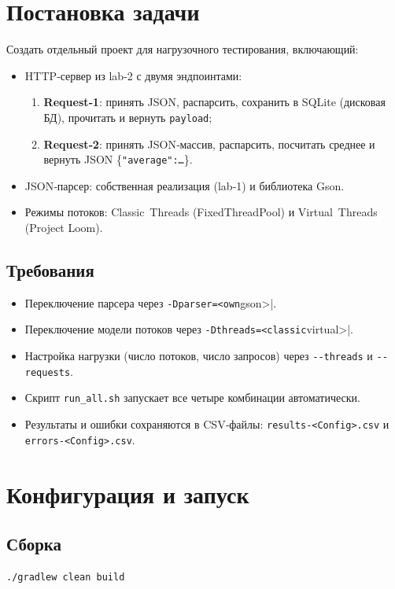 \documentclass[areasetadvanced]{scrartcl}
\begin{document}
\newpage
\section{Постановка задачи}
Создать отдельный проект для нагрузочного тестирования, включающий:
\begin{itemize}
  \item HTTP‑сервер из lab‑2 с двумя эндпоинтами:
    \begin{enumerate}
      \item \textbf{Request‑1}: принять JSON, распарсить, сохранить в SQLite (дисковая БД), прочитать и вернуть \texttt{payload};
      \item \textbf{Request‑2}: принять JSON‑массив, распарсить, посчитать среднее и вернуть JSON \{\texttt{"average":…}\}.
    \end{enumerate}
  \item JSON‑парсер: собственная реализация (lab‑1) и библиотека Gson.
  \item Режимы потоков: Classic Threads (FixedThreadPool) и Virtual Threads (Project Loom).
\end{itemize}

\subsection{Требования}
\begin{itemize}
  \item Переключение парсера через \verb|-Dparser=<own|gson>|.
  \item Переключение модели потоков через \verb|-Dthreads=<classic|virtual>|.
  \item Настройка нагрузки (число потоков, число запросов) через \verb|--threads| и \verb|--requests|.
  \item Скрипт \verb|run_all.sh| запускает все четыре комбинации автоматически.
  \item Результаты и ошибки сохраняются в CSV‑файлы: \verb|results-<Config>.csv| и \verb|errors-<Config>.csv|.
\end{itemize}

\newpage
\section{Конфигурация и запуск}
\subsection{Сборка}
\begin{lstlisting}
./gradlew clean build
\end{lstlisting}
\end{document}
